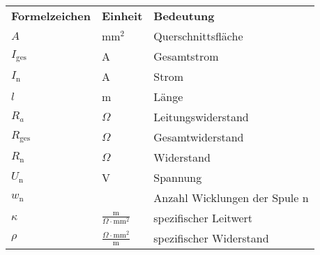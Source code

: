 \begin{table}[hbt]	
	\renewcommand{\arraystretch}{2}
	\begin{tabular}{p{4cm}p{3cm}l}
		\textbf{Formelzeichen} & \textbf{Einheit} & \textbf{Bedeutung}\\
	
        $A$ & mm$^2$ & Querschnittsfläche\\
		$I_{\text{ges}}$ & A & Gesamtstrom \\
        $I_\text{n}$ & A & Strom \\
        $l$ & m & Länge\\
        $R_a$ & $\Omega$ & Leitungswiderstand\\
		$R_{\text{ges}}$ & $\Omega$ & Gesamtwiderstand \\
        $R_\text{n}$ & $\Omega$ & Widerstand \\
        $U_\text{n}$ & V & Spannung \\
        $w_\text{n}$ & & Anzahl Wicklungen der Spule n\\

        $\kappa$ & $\frac{\text{m}}{\Omega \cdot \text{mm}^2}$ & spezifischer Leitwert\\
        $\rho$ & $\frac{\Omega \cdot \text{mm}^2}{\text{m}}$ & spezifischer Widerstand\\
        
	\end{tabular} 
\end{table}